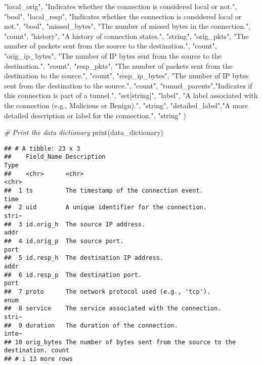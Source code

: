 \documentclass[
]{article}
\newenvironment{Shaded}{\begin{snugshade}}{\end{snugshade}}
\newcommand{\CommentTok}[1]{\textcolor[rgb]{0.56,0.35,0.01}{\textit{#1}}}
\newcommand{\FunctionTok}[1]{\textcolor[rgb]{0.00,0.00,0.00}{#1}}
\newcommand{\NormalTok}[1]{#1}
\newcommand{\StringTok}[1]{\textcolor[rgb]{0.31,0.60,0.02}{#1}}
\begin{document}
\begin{Shaded}
\begin{Highlighting}[]
  \StringTok{"local\_orig"}\NormalTok{,    }\StringTok{"Indicates whether the connection is considered local or not."}\NormalTok{, }\StringTok{"bool"}\NormalTok{,}
  \StringTok{"local\_resp"}\NormalTok{,    }\StringTok{"Indicates whether the connection is considered local or not."}\NormalTok{, }\StringTok{"bool"}\NormalTok{,}
  \StringTok{"missed\_bytes"}\NormalTok{,  }\StringTok{"The number of missed bytes in the connection."}\NormalTok{, }\StringTok{"count"}\NormalTok{,}
  \StringTok{"history"}\NormalTok{,       }\StringTok{"A history of connection states."}\NormalTok{,             }\StringTok{"string"}\NormalTok{,}
  \StringTok{"orig\_pkts"}\NormalTok{,     }\StringTok{"The number of packets sent from the source to the destination."}\NormalTok{, }\StringTok{"count"}\NormalTok{,}
  \StringTok{"orig\_ip\_bytes"}\NormalTok{, }\StringTok{"The number of IP bytes sent from the source to the destination."}\NormalTok{, }\StringTok{"count"}\NormalTok{,}
  \StringTok{"resp\_pkts"}\NormalTok{,     }\StringTok{"The number of packets sent from the destination to the source."}\NormalTok{, }\StringTok{"count"}\NormalTok{,}
  \StringTok{"resp\_ip\_bytes"}\NormalTok{, }\StringTok{"The number of IP bytes sent from the destination to the source."}\NormalTok{, }\StringTok{"count"}\NormalTok{,}
  \StringTok{"tunnel\_parents"}\NormalTok{,}\StringTok{"Indicates if this connection is part of a tunnel."}\NormalTok{, }\StringTok{"set[string]"}\NormalTok{,}
  \StringTok{"label"}\NormalTok{,         }\StringTok{"A label associated with the connection (e.g., \textquotesingle{}Malicious\textquotesingle{} or \textquotesingle{}Benign\textquotesingle{})."}\NormalTok{, }\StringTok{"string"}\NormalTok{,}
  \StringTok{"detailed\_label"}\NormalTok{,}\StringTok{"A more detailed description or label for the connection."}\NormalTok{, }\StringTok{"string"}
\NormalTok{)}

\CommentTok{\# Print the data dictionary}
\FunctionTok{print}\NormalTok{(data\_dictionary)}
\end{Highlighting}
\end{Shaded}

\begin{verbatim}
## # A tibble: 23 x 3
##    Field_Name Description                                                  Type 
##    <chr>      <chr>                                                        <chr>
##  1 ts         The timestamp of the connection event.                       time 
##  2 uid        A unique identifier for the connection.                      stri~
##  3 id.orig_h  The source IP address.                                       addr 
##  4 id.orig_p  The source port.                                             port 
##  5 id.resp_h  The destination IP address.                                  addr 
##  6 id.resp_p  The destination port.                                        port 
##  7 proto      The network protocol used (e.g., 'tcp').                     enum 
##  8 service    The service associated with the connection.                  stri~
##  9 duration   The duration of the connection.                              inte~
## 10 orig_bytes The number of bytes sent from the source to the destination. count
## # i 13 more rows
\end{verbatim}
\end{document}

